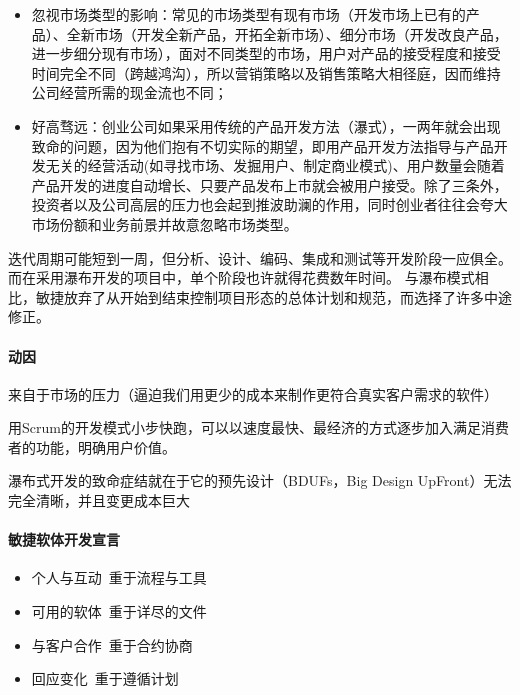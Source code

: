 \documentclass[letterpaper,10pt,english]{sphinxmanual}
\begin{document}
\begin{itemize}
\item {} 
忽视市场类型的影响：常见的市场类型有现有市场（开发市场上已有的产品）、全新市场（开发全新产品，开拓全新市场）、细分市场（开发改良产品，进一步细分现有市场），面对不同类型的市场，用户对产品的接受程度和接受时间完全不同（跨越鸿沟），所以营销策略以及销售策略大相径庭，因而维持公司经营所需的现金流也不同；

\item {} 
好高骛远：创业公司如果采用传统的产品开发方法（瀑式），一两年就会出现致命的问题，因为他们抱有不切实际的期望，即用产品开发方法指导与产品开发无关的经营活动(如寻找市场、发掘用户、制定商业模式)、用户数量会随着产品开发的进度自动增长、只要产品发布上市就会被用户接受。除了三条外，投资者以及公司高层的压力也会起到推波助澜的作用，同时创业者往往会夸大市场份额和业务前景并故意忽略市场类型。

\end{itemize}

迭代周期可能短到一周，但分析、设计、编码、集成和测试等开发阶段一应俱全。而在采用瀑布开发的项目中，单个阶段也许就得花费数年时间。
与瀑布模式相比，敏捷放弃了从开始到结束控制项目形态的总体计划和规范，而选择了许多中途修正。


\paragraph{动因}
\label{\detokenize{chapter_project/Scrum:id2}}
来自于市场的压力（逼迫我们用更少的成本来制作更符合真实客户需求的软件）

用Scrum的开发模式小步快跑，可以以速度最快、最经济的方式逐步加入满足消费者的功能，明确用户价值。

瀑布式开发的致命症结就在于它的预先设计（BDUFs，Big Design
Up\sphinxhyphen{}Front）无法完全清晰，并且变更成本巨大


\paragraph{敏捷软体开发宣言}
\label{\detokenize{chapter_project/Scrum:id3}}\begin{itemize}
\item {} 
个人与互动 重于流程与工具

\item {} 
可用的软体 重于详尽的文件

\item {} 
与客户合作 重于合约协商

\item {} 
回应变化 重于遵循计划

\end{itemize}
\end{document}
